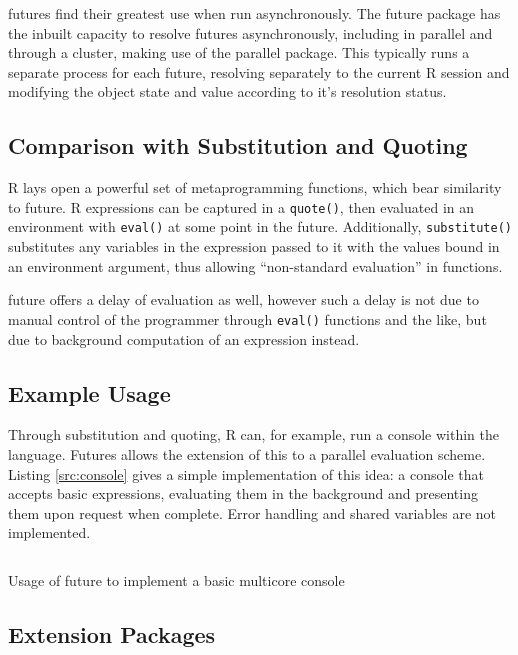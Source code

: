 \documentclass[a4paper,10pt]{article}
\begin{document}
futures find their greatest use when run asynchronously. The future
package has the inbuilt capacity to resolve futures asynchronously,
including in parallel and through a cluster, making use of the
parallel package. This typically runs a separate process for each
future, resolving separately to the current R session and modifying
the object state and value according to it's resolution status.

\subsection{Comparison with Substitution and Quoting}
\label{sec:comparison-with-non}

R lays open a powerful set of metaprogramming functions, which bear
similarity to future. R expressions can be captured in a
\texttt{quote()}, then evaluated in an environment with \texttt{eval()}
at some point in the future. Additionally, \texttt{substitute()}
substitutes any variables in the expression passed to it with the
values bound in an environment argument, thus allowing ``non-standard
evaluation'' in functions.

future offers a delay of evaluation as well, however such a delay is
not due to manual control of the programmer through \texttt{eval()}
functions and the like, but due to background computation of an
expression instead.

\subsection{Example Usage}
\label{sec:examples}

Through substitution and quoting, R can, for example, run a console within the
language. Futures allows the extension of this to a parallel evaluation scheme.
Listing \ref{src:console} gives a simple implementation of this idea: a console
that accepts basic expressions, evaluating them in the background and
presenting them upon request when complete.  Error handling and shared
variables are not implemented.

\begin{listing}
\inputminted{r}{R/review-future.R}
\caption{Usage of future to implement a basic multicore console}
\label{src:console}
\end{listing}

\subsection{Extension Packages}
\label{sec:extension-packages}
\end{document}
